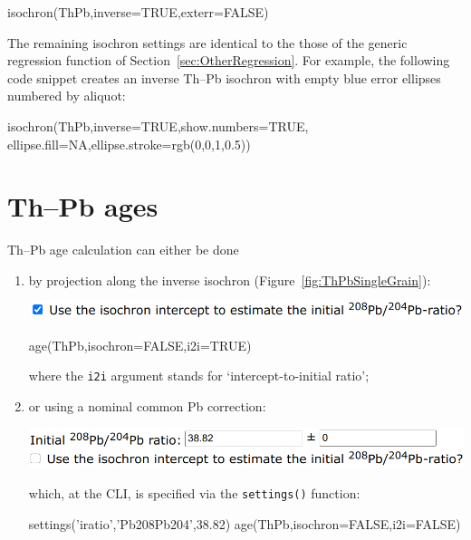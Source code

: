 \begin{refsection}
\begin{console}
isochron(ThPb,inverse=TRUE,exterr=FALSE)
\end{console}

The remaining isochron settings are identical to the those of the
generic regression function of Section~\ref{sec:OtherRegression}. For
example, the following code snippet creates an inverse Th--Pb isochron
with empty blue error ellipses numbered by aliquot:

\begin{script}
isochron(ThPb,inverse=TRUE,show.numbers=TRUE,
         ellipse.fill=NA,ellipse.stroke=rgb(0,0,1,0.5))
\end{script}

\section{Th--Pb ages}\label{sec:ThPbAges}

Th--Pb age calculation can either be done

\begin{enumerate}

\item by projection along the inverse isochron
  (Figure~\ref{fig:ThPbSingleGrain}):

\noindent\includegraphics[width=.75\linewidth]{../figures/ThPbAgei2i.png}

\begin{console}
age(ThPb,isochron=FALSE,i2i=TRUE)
\end{console}

\noindent where the \texttt{i2i} argument stands for
`intercept-to-initial ratio';

\item or using a nominal common Pb correction:

\noindent\includegraphics[width=.75\linewidth]{../figures/ThPbAgePb0.png}

\noindent which, at the CLI, is specified via the \texttt{settings()} function:

\begin{script}
settings('iratio','Pb208Pb204',38.82)
age(ThPb,isochron=FALSE,i2i=FALSE)
\end{script}


\end{enumerate}
\end{refsection}

